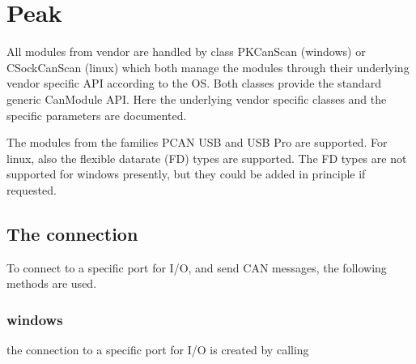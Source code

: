 \documentclass[a4paper,10pt,english]{sphinxmanual}
\begin{document}
\chapter{Peak}
\label{\detokenize{vendors/peak:peak}}\label{\detokenize{vendors/peak::doc}}
All modules from vendor {\hyperref[\detokenize{vendors/peak:peak}]{}} are handled by class PKCanScan (windows) or CSockCanScan (linux) which
both manage the modules through their underlying vendor specific API according to the OS.
Both classes provide the standard generic CanModule API.
Here the underlying vendor specific classes and the specific parameters are documented.

The modules from the families PCAN USB and USB Pro are supported. For linux, also the flexible
datarate (FD) types are supported. The FD types are not supported for windows presently, but they
could be added in principle if requested.


\section{The connection}
\label{\detokenize{vendors/peak:the-connection}}
To connect to a specific port for I/O, and send CAN messages, the following methods are used.


\subsection{windows}
\label{\detokenize{vendors/peak:windows}}
the connection to a specific port for I/O is created by calling
\end{document}
